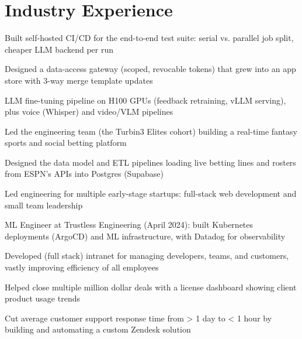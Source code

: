 \documentclass[print]{jack-resume}
\begin{document}

\section{Industry Experience}

\begin{tightemize}
    \item Built self-hosted CI/CD for the end-to-end test suite: serial vs. parallel job split, cheaper LLM backend per run
    \item Designed a data-access gateway (scoped, revocable tokens) that grew into an app store with 3-way merge template updates
    \item LLM fine-tuning pipeline on H100 GPUs (feedback retraining, vLLM serving), plus voice (Whisper) and video/VLM pipelines
\end{tightemize}
\sectionsep

\begin{tightemize}
    \item Led the engineering team (the Turbin3 Elites cohort) building a real-time fantasy sports and social betting platform
    \item Designed the data model and ETL pipelines loading live betting lines and rosters from ESPN's APIs into Postgres (Supabase)
\end{tightemize}
\sectionsep

\begin{tightemize}
    \item Led engineering for multiple early-stage startups: full-stack web development and small team leadership
    \item ML Engineer at Trustless Engineering (April 2024): built Kubernetes deployments (ArgoCD) and ML infrastructure, with Datadog for observability
\end{tightemize}
\sectionsep

\begin{tightemize}
    \item Developed (full stack) intranet for managing developers, teams, and customers, vastly improving efficiency of all employees
    \item Helped close multiple million dollar deals with a license dashboard showing client product usage trends
    \item Cut average customer support response time from > 1 day to < 1 hour by building and automating a custom Zendesk solution
\end{tightemize}
\sectionsep
\end{document}
